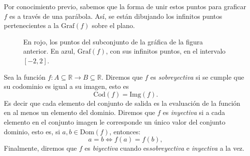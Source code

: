 \begin{example}
 Por conocimiento previo, sabemos que la forma de unir estos puntos para graficar $f$ es a través de una parábola. Así, 
 se están dibujando los infinitos puntos pertenecientes a la $\text{Graf}(f)$ sobre el plano.
        \begin{figure}[H] 
            \begin{center}
                \end{center}
            \caption{En rojo, los puntos del subconjunto de la gráfica de la figura anterior. En azul, $\text{Graf}(f)$, con sus infinitos puntos, en el intervalo $[-2,2]$.}
        \end{figure}
\end{example}
\begin{definition}
  
  Sea la funci\'on $f: A \subseteq \mathbb{R} \rightarrow B \subseteq \mathbb{R}$. Diremos que
   $f$ es \textit{sobreyectiva} si se cumple que su codominio es igual a su imagen, esto es
   \begin{equation*}
        \text{Cod}(f)=\text{Img}(f).
    \end{equation*}   Es decir que cada elemento del conjunto de salida es la evaluación de la función en al menos un elemento del dominio.
 Diremos que $f$ es   \textit{inyectiva} si a cada elemento en el conjunto imagen le corresponde un único
    valor del  conjunto dominio, esto es,   si  $a,b\in \text{Dom}(f)$, entonces:
     \begin{equation*}
        a=b \iff f(a)=f(b),
    \end{equation*} 
 Finalmente, diremos que $f$  es \textit{biyectiva} cuando es\textit{sobreyectiva} e \textit{inyectiva} a la vez.
\end{definition}

